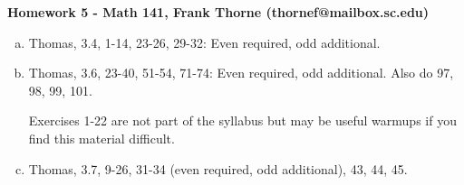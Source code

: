 \documentclass[12pt]{article}
\begin{document}
\setlength{\topmargin}{-2mm}





\begin{center}{\bf Homework 5 - Math 141, Frank Thorne (thornef@mailbox.sc.edu)}
\end{center}

\begin{enumerate}[(a)]


\item
Thomas, 3.4, 1-14, 23-26, 29-32: Even required, odd additional.

\item
Thomas, 3.6, 23-40, 51-54, 71-74: Even required, odd additional.
Also do 97, 98, 99, 101.

Exercises 1-22 are not part of the syllabus but may be useful warmups if you
find this material difficult.

\item
Thomas, 3.7, 9-26, 31-34 (even required, odd additional), 43, 44, 45.

\end{enumerate}
\end{document}
